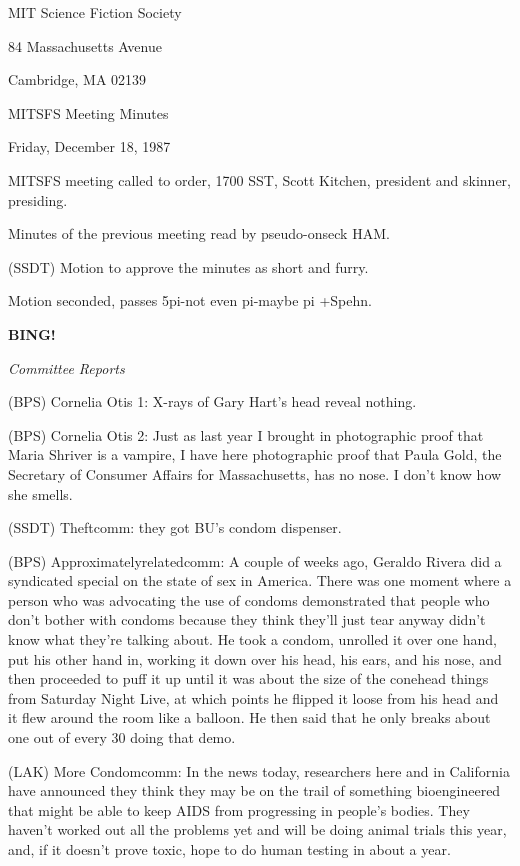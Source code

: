 \documentclass[12pt]{article}
\newcommand{\bing}{{\bf BING!} }
\newcommand{\goto}[1]{\bing \vskip 12pt \centerline{{\em{#1}}}}
\begin{document}
\begin{center}

MIT Science Fiction Society 

84 Massachusetts Avenue

Cambridge, MA 02139

\vspace{12pt}

MITSFS Meeting Minutes 

Friday, December 18, 1987

\end{center}
 
\vspace{18pt}

\setlength{\parskip}{6pt}

\noindent
MITSFS meeting called to order, 1700 SST,
Scott Kitchen, president and skinner, presiding.

Minutes of the previous meeting read by pseudo-onseck HAM.

(SSDT) Motion to approve the minutes as short and furry.

Motion seconded, passes 5pi-not even pi-maybe pi +Spehn.

\goto{Committee Reports}

(BPS) Cornelia Otis 1: X-rays of Gary Hart's head reveal nothing.

(BPS) Cornelia Otis 2: Just as last year I brought in photographic proof that Maria Shriver is a vampire, I have here photographic proof that Paula Gold, the Secretary of Consumer Affairs for Massachusetts, has no nose. I don't know how she smells.

(SSDT) Theftcomm: they got BU's condom dispenser.

(BPS) Approximatelyrelatedcomm: A couple of weeks ago, Geraldo Rivera did a syndicated special on the state of sex in America. There was one moment where a person who was advocating the use of condoms demonstrated that people who don't bother with condoms because they think they'll just tear anyway didn't know what they're talking about. He took a condom, unrolled it over one hand, put his other hand in, working it down over his head, his ears, and his nose, and then proceeded to puff it up until it was about the size of the conehead things from Saturday Night Live, at which points he flipped it loose from his head and it flew around the room like a balloon. He then said that he only breaks about one out of every 30 doing that demo.

(LAK) More Condomcomm: In the news today, researchers here and in California have announced they think they may be on the trail of something bioengineered that might be able to keep AIDS from progressing in people's bodies. They haven't worked out all the problems yet and will be doing animal trials this year, and, if it doesn't prove toxic, hope to do human testing in about a year.
\end{document}
